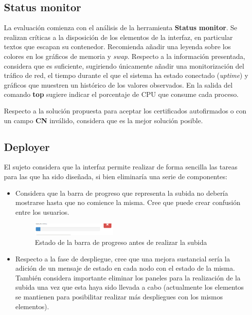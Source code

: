 \subsection{Status monitor}
La evaluación comienza con el análisis de la herramienta \textbf{Status monitor}. Se realizan críticas a la disposición de los elementos de la interfaz, en particular textos que escapan su contenedor. Recomienda añadir una leyenda sobre los colores en los gráficos de memoria y \textit{swap}. Respecto a la información presentada, considera que es suficiente, sugiriendo únicamente añadir una monitorización del tráfico de red, el tiempo durante el que el sistema ha estado conectado (\textit{uptime}) y gráficos que muestren un histórico de los valores observados. En la salida del comando \textbf{top} sugiere indicar el porcentaje de CPU que consume cada proceso.

Respecto a la solución propuesta para aceptar los certificados autofirmados o con un campo \textbf{CN} inválido, considera que es la mejor solución posible.

\subsection{Deployer}

El sujeto considera que la interfaz permite realizar de forma sencilla las tareas para las que ha sido diseñada, si bien eliminaría una serie de componentes:

\begin{itemize}
	\item Considera que la barra de progreso que representa la subida no debería mostrarse hasta que no comience la misma. Cree que puede crear confusión entre los usuarios.
	\begin{figure}[H]
	\centering
	\includegraphics[width=0.4\textwidth]{progressbar}
	\caption{Estado de la barra de progreso antes de realizar la subida}
	\label{progressbar}
	\end{figure}

	\item Respecto a la fase de despliegue, cree que una mejora sustancial sería la adición de un mensaje de estado en cada nodo con el estado de la misma. También considera importante eliminar los paneles para la realización de la subida una vez que esta haya sido llevada a cabo (actualmente los elementos se mantienen para posibilitar realizar más despliegues con los mismos elementos).
\end{itemize}
